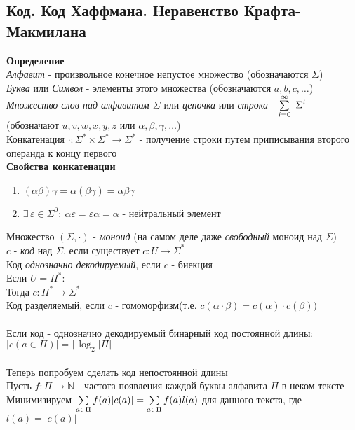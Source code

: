 \documentclass[12pt]{article}
\begin{document}
\subsection{Код. Код Хаффмана. Неравенство Крафта-Макмилана}
\textbf{Определение}\\
\textit{Алфавит} - произвольное конечное непустое множество (обозначаются $\Sigma$)\\
\textit{Буква} или \textit{Символ} - элементы этого множества (обозначаются $a,b,c,\ldots$)\\
\textit{Множество слов над алфавитом $\Sigma$} или \textit{цепочка} или \textit{строка} - $\sum\limits_{i=0}^\infty\ \Sigma^i$ (обозначают $u,v,w,x,y,z$ или $\alpha, \beta, \gamma, \ldots$)\\
Конкатенация $\cdot: \Sigma^*\times\Sigma^* \rightarrow \Sigma^*$ - получение строки путем приписывания второго операнда к концу первого\\
\textbf{Свойства конкатенации}
\begin{enumerate}
    \item $(\alpha\beta)\gamma = \alpha(\beta\gamma) = \alpha\beta\gamma$
    \item $\exists\,\varepsilon \in \Sigma^0:\ \alpha\varepsilon = \varepsilon\alpha=\alpha$ - нейтральный элемент
\end{enumerate}
Множество $(\Sigma, \cdot)$ - \textit{моноид} (на самом деле даже \textit{свободный} моноид над $\Sigma$)\\
$c$ - \textit{код} над $\Sigma$, если существует $c: U\rightarrow \Sigma^*$\\
Код \textit{однозначно декодируемый}, если $c$ - биекция\\
Если $U = \Pi^*$:\\
Тогда $c:\Pi^*\rightarrow \Sigma^*$\\
Код разделяемый, если $c$ - гомоморфизм(т.е. $c(\alpha\cdot\beta) = c(\alpha)\cdot c(\beta))$\\\\
Если код - однозначно декодируемый бинарный код постоянной длины:\\
$|c(a\in \Pi)| = \lceil \log_2 |\Pi| \rceil$\\\\
Теперь попробуем сделать код непостоянной длины\\
Пусть $f:\Pi \rightarrow \mathbb{N}$ - частота появления каждой буквы алфавита $\Pi$ в неком тексте\\
Минимизируем $\sum\limits_{a\in\Pi} f(a)|c(a)| = \sum\limits_{a\in\Pi} f(a)l(a)$ для данного текста, где $l(a)=|c(a)|$\\
\end{document}
